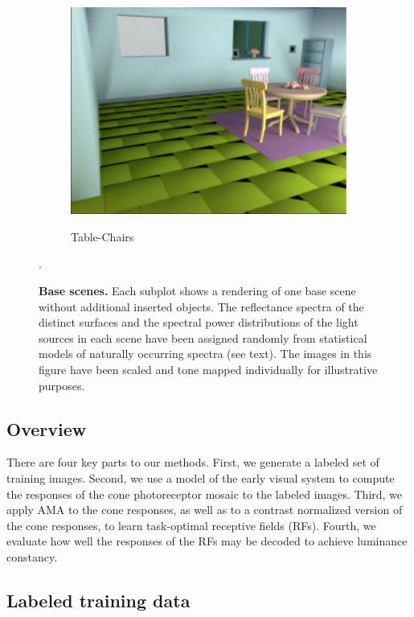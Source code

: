 \documentclass{jov}
\begin{document}
\begin{figure}
\begin{subfigure}[b]{0.22 \textwidth}
        \label{fig:baseSceneMill}
    \end{subfigure}    
    ~
    \begin{subfigure}[b]{0.22 \textwidth}
        \caption{Table-Chairs}    
        \includegraphics[width=\textwidth]{../FiguresDraft5/Figure2/Figure2_c.pdf}
        \label{fig:baseSceneTableChairs}
    \end{subfigure}
    \caption{{\bf Base scenes.} Each subplot shows a rendering of one base scene without additional inserted objects.  The reflectance spectra of the distinct surfaces and the spectral power distributions of the light sources in each scene have been assigned randomly from statistical models of naturally occurring spectra (see text). The images in this figure have been scaled and tone mapped individually for illustrative purposes.}
\label{fig:baseScenes}. \end{figure}

\subsection{Overview}
There are four key parts to our methods.  First, we generate a labeled set of training images.  Second, we use a model of the early visual system to compute the responses of the cone photoreceptor mosaic to the labeled images. Third, we apply AMA to the cone responses, as well as to a contrast normalized version of the cone responses, to learn task-optimal receptive fields (RFs). Fourth, we evaluate how well the responses of the RFs may be decoded to achieve luminance constancy.


\subsection{Labeled training data} \label{method:VirtualWorld}
\end{document}
